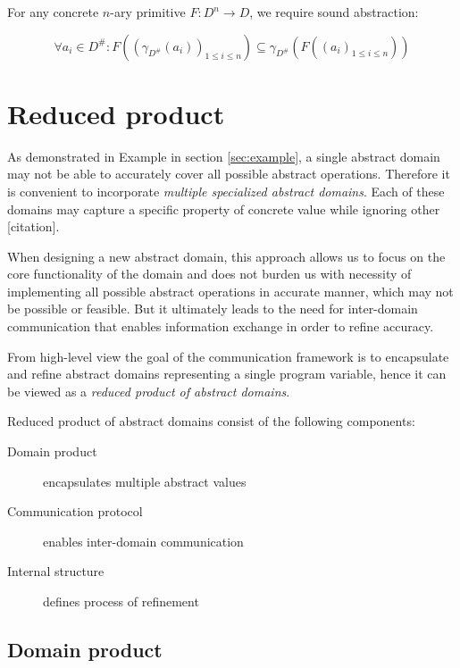 \documentclass[12pt,oneside]{fithesis2}
\theoremstyle{definition}
\begin{document}
For any concrete $n$-ary primitive $F: D^n \to D$, we require sound abstraction: \cite{CousotEtAl06-ASIAN}

\[
\forall a_i \in D^\#: F((\gamma_{D^\#}(a_i))_{1 \le i \le n}) \subseteq \gamma_{D^\#}(F((a_i)_{1 \le i \le n}))
\]

\chapter{Reduced product}

As demonstrated in Example in section \ref{sec:example}, a single abstract domain may not be able to accurately cover all possible abstract operations. Therefore it is convenient to incorporate \textit{multiple specialized abstract domains}. Each of these domains may capture a specific property of concrete value while ignoring other [citation].

When designing a new abstract domain, this approach allows us to focus on the core functionality of the domain and does not burden us with necessity of implementing all possible abstract operations in accurate manner, which may not be possible or feasible. But it ultimately leads to the need for inter-domain communication that enables information exchange in order to refine accuracy.

From high-level view the goal of the communication framework is to encapsulate and refine abstract domains representing a single program variable, hence it can be viewed as a \textit{reduced product of abstract domains}.

Reduced product of abstract domains consist of the following components:

\begin{description}
  \item[Domain product] encapsulates multiple abstract values
  \item[Communication protocol] enables inter-domain communication
  \item[Internal structure] defines process of refinement
\end{description}

\section{Domain product}\label{sec:domain-product}
\end{document}
